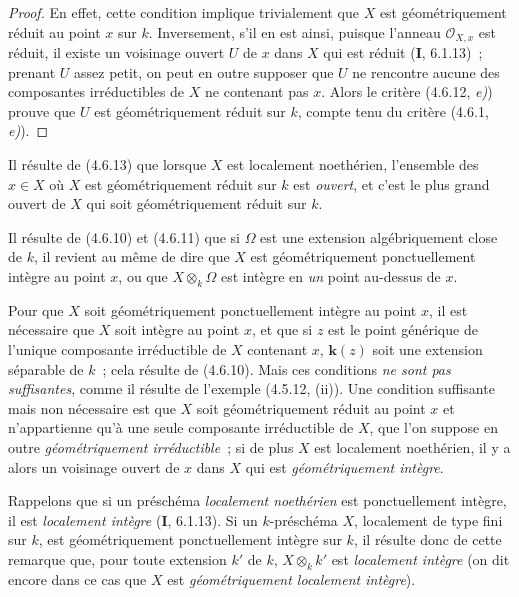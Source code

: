 \begin{proof}
En effet, cette condition implique trivialement que $X$ est géométriquement
réduit au point $x$ sur $k$. Inversement, s'il en est ainsi, puisque l'anneau
$\mathcal O_{X,x}$ est réduit, il existe un voisinage ouvert $U$ de $x$ dans
$X$ qui est réduit (\textbf{I}, 6.1.13)~; prenant $U$ assez petit, on peut en outre
supposer que $U$ ne rencontre aucune des composantes irréductibles de $X$ ne
contenant pas $x$. Alors le critère (4.6.12, \emph{e)}) prouve que $U$ est
géométriquement réduit sur $k$, compte tenu du critère (4.6.1, \emph{e)}).
\end{proof}

Il résulte de (4.6.13) que lorsque $X$ est localement noethérien, l'ensemble
des $x\in X$ où $X$ est géométriquement réduit sur $k$ est \emph{ouvert}, et
c'est le plus grand ouvert de $X$ qui soit géométriquement réduit sur $k$.

\begin{env}[4.6.14]
\label{IV.2.4.6.14-fr}
Il résulte de (4.6.10) et (4.6.11) que si $\Omega$ est une extension
algébriquement close de $k$, il revient au même de dire que $X$ est
géométriquement ponctuellement intègre au point $x$, ou que $X\otimes_k\Omega$
est intègre en \emph{un} point au-dessus de $x$.

Pour que $X$ soit géométriquement ponctuellement intègre au point $x$, il est
nécessaire que $X$ soit intègre au point $x$, et que si $z$ est le point
générique de l'unique composante irréductible de $X$ contenant $x$, $\boldsymbol{k}(z)$ soit
une extension séparable de $k$~; cela résulte de (4.6.10). Mais ces conditions
\emph{ne sont pas suffisantes}, comme il résulte de l'exemple (4.5.12, (ii)).
Une condition suffisante mais non nécessaire est que $X$ soit géométriquement
réduit au point $x$ et n'appartienne qu'à une seule composante irréductible de
$X$, que
l'on suppose en outre \emph{géométriquement irréductible}~; si de plus $X$ est
localement noethérien, il y a alors un voisinage ouvert de $x$ dans $X$ qui est
\emph{géométriquement intègre}.
\end{env}

Rappelons que si un préschéma \emph{localement noethérien} est ponctuellement intègre,
il est \emph{localement intègre} (\textbf{I}, 6.1.13). Si un $k$-préschéma $X$, localement de
type fini sur $k$, est géométriquement ponctuellement intègre sur $k$, il
résulte donc de cette remarque que, pour toute extension $k'$ de $k$,
$X\otimes_k k'$ est \emph{localement intègre} (on dit encore dans ce cas que
$X$ est \emph{géométriquement localement intègre}).


